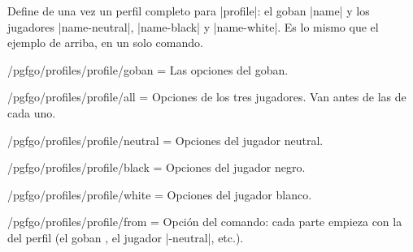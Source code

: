 \begin{command}{\pgfgodefineprofile{}}
	Define de una vez un perfil completo para |profile|: el goban |name| y los jugadores |name-neutral|, |name-black| y |name-white|. Es lo mismo que el ejemplo de arriba, en un solo comando.

	\begin{codeexample}[width=3cm]


		\begin{goban}[partial = A1:C3]
		\end{goban}
	\end{codeexample}

	\begin{key}{/pgfgo/profiles/profile/goban = }
		Las opciones del goban.
	\end{key}

	\begin{key}{/pgfgo/profiles/profile/all = }
		Opciones de los tres jugadores. Van antes de las de cada uno.
	\end{key}

	\begin{key}{/pgfgo/profiles/profile/neutral = }
		Opciones del jugador neutral.
	\end{key}

	\begin{key}{/pgfgo/profiles/profile/black = }
		Opciones del jugador negro.
	\end{key}

	\begin{key}{/pgfgo/profiles/profile/white = }
		Opciones del jugador blanco.
	\end{key}

	\begin{key}{/pgfgo/profiles/profile/from = }
		Opción del comando: cada parte empieza con la del perfil  (el goban , el jugador |-neutral|, etc.).
	\end{key}
\end{command}
